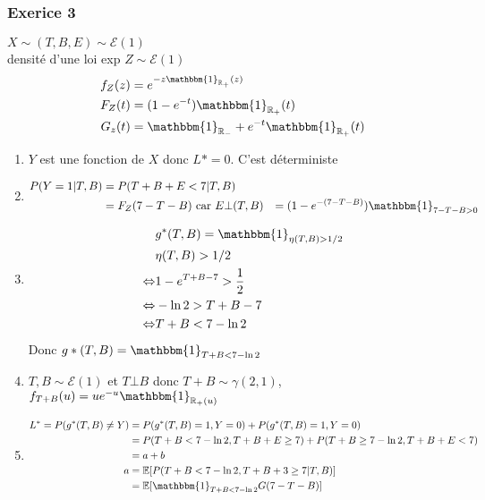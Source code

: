 \documentclass{article}
\theoremstyle{plain}%
\theoremstyle{definition}
\theoremstyle{remark}
\begin{document}
\subsubsection{Exerice 3}
$ X \sim (T,B,E) \sim \mathcal{E}(1) $ \\
densité d'une loi exp $ Z \sim \mathcal{E}(1) $ \begin{align*}
    f_Z(z) &= e^{ -z \mathbbm{1}_{\mathbb{R}_+} (z)} \\
    F_Z(t) &= (1 - e^{-t}) \mathbbm{1}_{\mathbb{R}_+}(t) \\
    G_z(t) &= \mathbbm{1}_{\mathbb{R}_-}+e^{-t} \mathbbm{1}_{\mathbb{R}_+}(t)
\end{align*}
\begin{enumerate}
    \item $ Y $ est une fonction de $ X $ donc $ L* = 0 $. C'est déterministe
    \item \begin{align*}
        P(Y=1 | T, B) &= P(T + B + E < 7 | T, B) \\
            &= F_Z (7 - T - B) \text{ car } E \bot (T, B)
            &= (1 - e^{- ( 7 - T - B)}) \mathbbm{1}_{7 - T - B > 0}
    \end{align*} 
    \item \begin{align*}
        &g^*(T,B) = \mathbbm{1}_{\eta (T, B) > 1/2} \\
        & \eta (T, B) > 1/2 \\
        \Leftrightarrow& 1 - e^{T + B - 7} > \frac{1}{2} \\
        \Leftrightarrow& - \ln 2 > T + B - 7 \\
        \Leftrightarrow& T + B < 7 - \ln 2
    \end{align*}
    Donc $ g*(T,B) = \mathbbm{1}_{T + B < 7 - \ln 2} $ 
    \item $ T, B \sim \mathcal{E}(1) $  et $ T \bot B $ donc $ T + B \sim \gamma (2,1) $, $ f_{T + B} (u) = ue^{-u} \mathbbm{1}_{\mathbb{R}_+ (u)} $ 
    \item \begin{align*}
        L^* = P(g^*(T,B) \neq  Y) &= P(g^*(T, B) = 1, Y = 0) + P(g^* (T,B) = 1, Y = 0) \\
            &= P(T + B < 7 - \ln 2, T + B+ E \geq 7) + P(T+B \geq 7 - \ln 2, T+B+E < 7)\\
            &= a + b \\
        a &= \mathbb{E} [ P( T+B < 7 - \ln 2 , T+B+3 \geq 7 | T,B)]\\
        &= \mathbb{E}[ \mathbbm{1}_{T+B < 7 - \ln 2} G(7 - T - B)] \\

\end{align*}
\end{enumerate}
\end{document}
